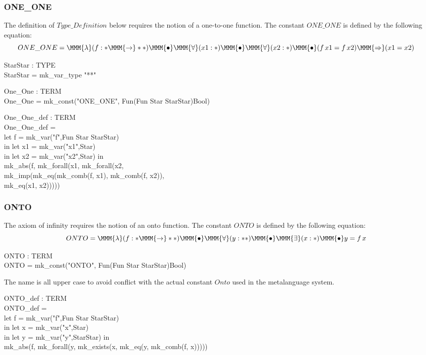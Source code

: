 \documentclass[a4paper,11pt,titlepage]{article}
\begin{document}
\begin{titlepage}
\subsubsection{ONE\_ONE}
The definition of $Type\_Definition$ below requires the notion of
a one-to-one function. The constant $ONE\_ONE$
is defined by the following equation:
$$ONE\_ONE = \MMM{\lambda}(f:* \MMM{\rightarrow} **)\MMM{\bullet}\MMM{\forall}(x1:*)\MMM{\bullet}\MMM{\forall}(x2:*)\MMM{\bullet}(f\,x1 = f\,x2) \MMM{\Rightarrow} (x1 = x2)$$
\begin{HOLConst}
\+	\PrNL{}StarStar\PrNN{} : TYPE\\
\PrPH{}
\+	StarStar = mk\_var\_type "**"\\
\end{HOLConst}
\begin{HOLConst}
\+	\PrNL{}One\_One\PrNN{} : TERM\\
\PrPH{}
\+	One\_One = mk\_const("ONE\_ONE", Fun(Fun Star StarStar)Bool)\\
\end{HOLConst}
\begin{HOLConst}
\+	\PrNL{}One\_One\_def\PrNN{} : TERM\\
\PrPH{}
\+	One\_One\_def =\\
\+	let f = mk\_var("f",Fun Star StarStar)\\
\+	in let x1 = mk\_var("x1",Star)\\
\+	in let x2 = mk\_var("x2",Star) in\\
\+	mk\_abs(f, mk\_forall(x1, mk\_forall(x2,\\
\+		mk\_imp(mk\_eq(mk\_comb(f, x1), mk\_comb(f, x2)),\\
\+			mk\_eq(x1, x2)))))\\
\end{HOLConst}
\subsubsection{ONTO}
The axiom of infinity requires the notion of
an onto function. The constant $ONTO$
is defined by the following equation:
$$ONTO = \MMM{\lambda}(f:* \MMM{\rightarrow} **)\MMM{\bullet}\MMM{\forall}(y:**)\MMM{\bullet}\MMM{\exists}(x:*)\MMM{\bullet}y = f\,x$$
\begin{HOLConst}
\+	\PrNL{}ONTO\PrNN{} : TERM\\
\PrPH{}
\+	ONTO = mk\_const("ONTO", Fun(Fun Star StarStar)Bool)\\
\end{HOLConst}
The name is all upper case to avoid conflict with the actual constant
$Onto$ used in the metalanguage system.
\begin{HOLConst}
\+	\PrNL{}ONTO\_def\PrNN{} : TERM\\
\PrPH{}
\+	ONTO\_def =\\
\+	let f = mk\_var("f",Fun Star StarStar)\\
\+	in let x = mk\_var("x",Star)\\
\+	in let y = mk\_var("y",StarStar) in\\
\+	mk\_abs(f, mk\_forall(y, mk\_exists(x, mk\_eq(y, mk\_comb(f, x)))))\\
\end{HOLConst}

\end{titlepage}
\end{document}

